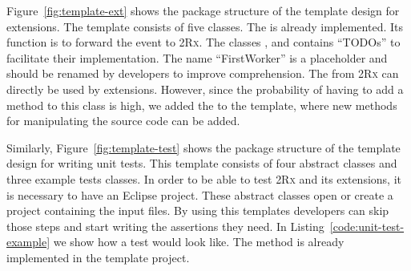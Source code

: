 \documentclass[type=bsc,accentcolor=tud9c]{tudthesis}
\newcommand{\toolcore}{\textsc{2Rx}}
\begin{document}
Figure~\ref{fig:template-ext} shows the package structure of the template design for extensions. The template consists of five classes. The  is already implemented. Its function is to forward the event to \toolcore{}. The classes ,  and  contains ``TODOs'' to facilitate their implementation. The name ``FirstWorker'' is a placeholder and should be renamed by developers to improve comprehension. The  from \toolcore{} can directly be used by extensions. However, since the probability of having to add a method to this class is high, we added the  to the template, where new methods for manipulating the source code can be added.

Similarly, Figure~\ref{fig:template-test} shows the package structure of the template design for writing unit tests. This template consists of four abstract classes and three example tests classes. In order to be able to test \toolcore{} and its extensions, it is necessary to have an Eclipse project. These abstract classes open or create a project containing the input files. By using this templates developers can skip those steps and start writing the assertions they need. In Listing~\ref{code:unit-test-example} we show how a test would look like. The method  is already implemented in the template project.
\end{document}
